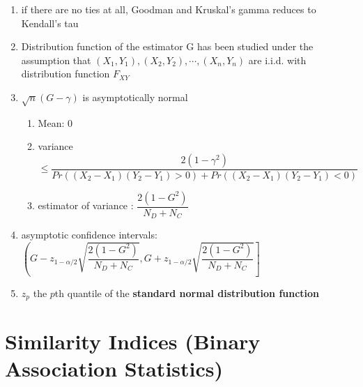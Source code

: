 \begin{enumerate}
    \item if there are no ties at all, Goodman and Kruskal’s gamma reduces to Kendall’s tau

    \item Distribution function of the estimator G has been studied under the assumption that $(X_1, Y_1), (X_2, Y_2), \cdots , (X_n, Y_n)$ are i.i.d. with distribution function $F_{XY}$

    \item $\sqrt{n}(G - \gamma)$ is asymptotically normal
    \begin{enumerate}
        \item Mean: $0$

        \item variance $
            \leq
            \dfrac{2(1 - \gamma^2)}{
                Pr((X_2 - X_1)(Y_2 - Y_1) > 0) + Pr((X_2 - X_1)(Y_2 - Y_1) < 0)
            }
        $

        \item estimator of variance	: $\dfrac{2(1 - G^2)}{N_D + N_C}$
    \end{enumerate}

    \item asymptotic confidence intervals:
    $
        \left(
            G - z_{1-\alpha/2}\sqrt{
                \dfrac{2(1-G^2)}{N_D+N_C}
            },
            G + z_{1-\alpha/2}\sqrt{
                \dfrac{2(1-G^2)}{N_D+N_C}
            }
        \right]
    $

    \item $z_p$ the $p$th quantile of the \textbf{standard normal distribution function}
\end{enumerate}


\section{Similarity Indices (Binary Association Statistics) \cite{ism-1}}\label{Multivariate Distributions: Similarity Indices (Binary Association Statistics)}

